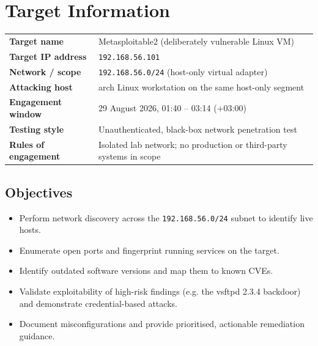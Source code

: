 \documentclass[11pt,a4paper]{article}
\begin{document}
\tableofcontents
\thispagestyle{empty}
\clearpage

\section{Target Information}

\begin{panel}
\renewcommand{\arraystretch}{1.5}
\begin{tabular}{L{4.5cm} L{9.7cm}}
\textbf{Target name} & Metasploitable2 (deliberately vulnerable Linux VM) \\
\textbf{Target IP address} & \texttt{192.168.56.101} \\
\textbf{Network / scope} & \texttt{192.168.56.0/24} (host-only virtual adapter) \\
\textbf{Attacking host} & arch Linux workstation on the same host-only segment \\
\textbf{Engagement window} & 29 August 2026, 01:40 -- 03:14 (+03:00) \\
\textbf{Testing style} & Unauthenticated, black-box network penetration test \\
\textbf{Rules of engagement} & Isolated lab network; no production or third-party systems in scope \\
\end{tabular}
\end{panel}

\subsection*{Objectives}
\begin{itemize}[leftmargin=1.4em]
\item Perform network discovery across the \texttt{192.168.56.0/24} subnet to identify live hosts.
\item Enumerate open ports and fingerprint running services on the target.
\item Identify outdated software versions and map them to known CVEs.
\item Validate exploitability of high-risk findings (e.g. the vsftpd 2.3.4 backdoor) and demonstrate credential-based attacks.
\item Document misconfigurations and provide prioritised, actionable remediation guidance.
\end{itemize}

\end{document}
